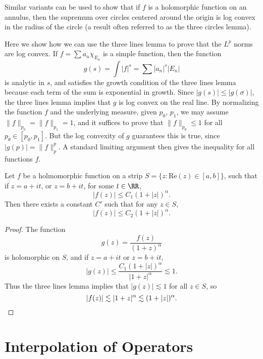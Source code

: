 \begin{remark}
    Similar variants can be used to show that if $f$ is a holomorphic function on an annulus, then the supremum over circles centered around the origin is log convex in the radius of the circle (a result often referred to as the three circles lemma).
\end{remark}

\begin{example}
    Here we show how we can use the three lines lemma to prove that the $L^p$ norms are log convex. If $f = \sum a_n \chi_{E_n}$ is a simple function, then the function
    \[ g(s) = \int |f|^s = \sum |a_n|^s |E_n| \]
    is analytic in $s$, and satisfies the growth condition of the three lines lemma because each term of the sum is exponential in growth. Since $|g(s)| \leq |g(\sigma)|$, the three lines lemma implies that $g$ is log convex on the real line. By normalizing the function $f$ and the underlying measure, given $p_0$, $p_1$, we may assume $\| f \|_{p_0} = \| f \|_{p_1} = 1$, and it suffices to prove that $\| f \|_{p_\theta} \leq 1$ for all $p_\theta \in [p_0, p_1]$. But the log convexity of $g$ guarantees this is true, since $|g(p)| = \| f \|_p^p$. A standard limiting argument then gives the inequality for all functions $f$.
\end{example}

\begin{example}
    Let $f$ be a holmomorphic function on a strip $S = \{ z : \text{Re}(z) \in [a,b] \}$, such that if $z = a + it$, or $z = b + it$, for some $t \in \RR$,
    \[ |f(z)| \leq C_1 (1 + |z|)^\alpha. \]
    Then there exists a constant $C'$ such that for any $z \in S$,
    \[ |f(z)| \leq C_2 (1 + |z|)^\alpha. \]
\end{example}
\begin{proof}
    The function
    \[ g(z) = \frac{f(z)}{(1 + z)^\alpha} \]
    is holomorphic on $S$, and if $z = a + it$ or $z = b + it$,
    \[ |g(z)| \leq \frac{C_1 (1 + |z|)^\alpha}{|1 + z|^\alpha} \lesssim 1. \]
    Thus the three lines lemma implies that $|g(z)| \lesssim 1$ for all $z \in S$, so
    \[ |f(z)| \lesssim |1 + z|^\alpha \lesssim (1 + |z|)^\alpha. \qedhere \]
\end{proof}

\section{Interpolation of Operators}

